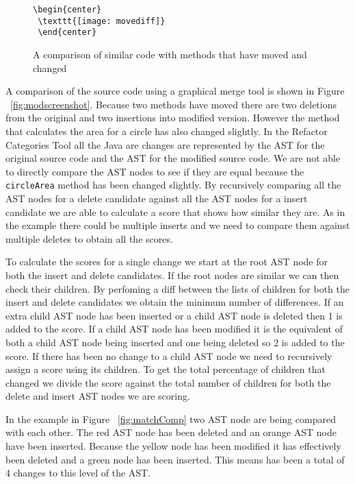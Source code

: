\begin{figure}[!t]
\begin{lstlisting}
\begin{center}
 \texttt{[image: movediff]}
 \end{center}
\end{lstlisting}
\caption{A comparison of similar code with methods that have moved and changed}
 \label{fig:orig}
\end{figure}


A comparison of the source code using a graphical merge tool is shown in Figure ~\ref{fig:modscreenshot}.  Because two methods have moved there are two deletions from the original and two insertions into modified version.  However the method that calculates the area for a circle has also changed slightly. In the Refactor Categories Tool all the Java are changes are represented by the AST for the original source code and the AST for the modified source code. We are not able to directly compare the AST nodes to see if they are equal because the \lstinline{circleArea} method has been changed slightly. By recursively comparing all the AST nodes for a delete candidate against all the AST nodes for a insert candidate we are able to calculate a score that shows how similar they are.  As in the example there could be multiple inserts and we need to compare them against multiple deletes to obtain all the scores.

To calculate the scores for a single change we start at the root AST node for both the insert and delete candidates.  If the root nodes are similar we can then check their children. By perfoming a diff between the lists of children for both the insert and delete candidates we obtain the minimum number of differences.  If an extra child AST node has been inserted or a child AST node is deleted then 1 is added to the score. If a child AST node has been modified it is the equivalent of both a child AST node being inserted and one being deleted so 2 is added to the score. If there has been no change to a child AST node we need to recursively assign a score using its children. To get the total percentage of children that changed we divide the score against the total number of children for both the delete and insert AST nodes we are scoring.

In the example in Figure ~\ref{fig:matchComp} two AST node are being compared with each other. The red AST node has been deleted and an orange AST node have been inserted. Because the yellow node has been modified it has effectively been deleted and a green node has been inserted. This means has been a total of 4 changes to this level of the AST. 

